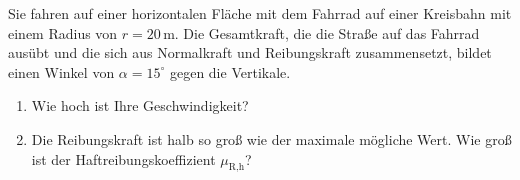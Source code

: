 \begin{MExercises}
\begin{MExercise}
\begin{MSolution}
\begin{enumerate}
   \end{enumerate}
   \end{MSolution}
   \end{MExercise}
    
  \begin{MExercise}
  Sie fahren auf einer horizontalen Fl\"ache mit dem Fahrrad auf einer Kreisbahn mit einem Radius von $r=20\,\text{m}$. Die Gesamtkraft, die die Stra{\ss}e auf das Fahrrad aus\"ubt und die sich aus Normalkraft und Reibungskraft zusammensetzt, bildet einen Winkel von $\alpha=15^{\circ}$ gegen die Vertikale. 
  \begin{enumerate}
  \item Wie hoch ist Ihre Geschwindigkeit?
  \item Die Reibungskraft ist halb so gro{\ss} wie der maximale m\"ogliche Wert. Wie gro{\ss} ist der Haftreibungskoeffizient $\mu_{\textrm{R,h}}$?
  \end{enumerate}
  
  
  
 
  

\end{MExercise}
\end{MExercises}
